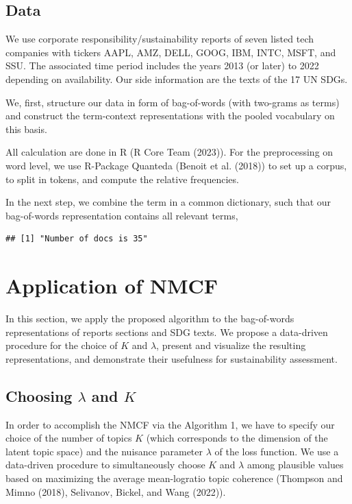 \documentclass[
]{article}
\begin{document}
\hypertarget{data}{%
\subsection{Data}\label{data}}

We use corporate responsibility/sustainability reports of seven listed tech companies with tickers AAPL, AMZ, DELL, GOOG, IBM, INTC, MSFT, and SSU. The associated time period includes the years 2013 (or later) to 2022 depending on availability. Our side information are the texts of the 17 UN SDGs.

We, first, structure our data in form of bag-of-words (with two-grams as terms) and construct the term-context representations with the pooled vocabulary on this basis.

All calculation are done in R (R Core Team (2023)). For the preprocessing on word level, we use R-Package Quanteda (Benoit et al. (2018)) to set up a corpus, to split in tokens, and compute the relative frequencies.

In the next step, we combine the term in a common dictionary, such that our bag-of-words representation contains all relevant terms,

\begin{verbatim}
## [1] "Number of docs is 35"
\end{verbatim}

\hypertarget{application-of-nmcf}{%
\section{Application of NMCF}\label{application-of-nmcf}}

In this section, we apply the proposed algorithm to the bag-of-words representations of reports sections and SDG texts. We propose a data-driven procedure for the choice of \(K\) and \(\lambda\), present and visualize the resulting representations, and demonstrate their usefulness for sustainability assessment.

\hypertarget{choosing-lambda-and-k}{%
\subsection{\texorpdfstring{Choosing \(\lambda\) and \(K\)}{Choosing \textbackslash lambda and K}}\label{choosing-lambda-and-k}}

In order to accomplish the NMCF via the Algorithm 1, we have to specify our choice of the number of topics \(K\) (which corresponds to the dimension of the latent topic space) and the nuisance parameter \(\lambda\) of the loss function. We use a data-driven procedure to simultaneously choose \(K\) and \(\lambda\) among plausible values based on maximizing the average mean-logratio topic coherence (Thompson and Mimno (2018), Selivanov, Bickel, and Wang (2022)).
\end{document}
